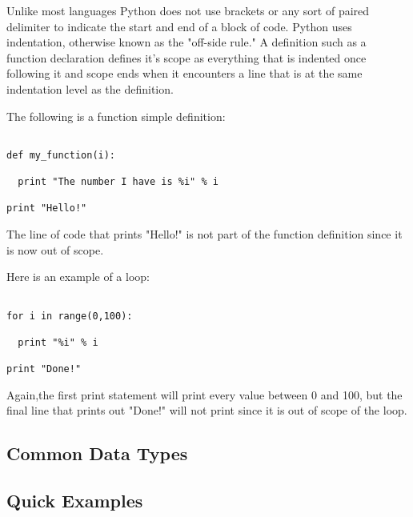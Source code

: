 \documentclass[12pt]{article}
\begin{document}
Unlike most languages Python does not use brackets or any sort of paired delimiter to indicate the start and end of a block of code. Python uses indentation, otherwise known as the "off-side rule." A definition such as a function declaration defines it's scope as everything that is indented once following it and scope ends when it encounters a line that is at the same indentation level as the definition. 

The following is a function simple definition:
\begin{verbatim}

def my_function(i):

  print "The number I have is %i" % i

print "Hello!"

\end{verbatim}

The line of code that prints "Hello!" is not part of the function definition since it is now out of scope.


Here is an example of a loop:
\begin{verbatim}

for i in range(0,100):

  print "%i" % i

print "Done!"
\end{verbatim}

Again,the first print statement will print every value between 0 and 100, but the final line that prints out "Done!" will not print since it is out of scope of the loop.

\subsection*{Common Data Types}






\subsection*{Quick Examples}
\end{document}
